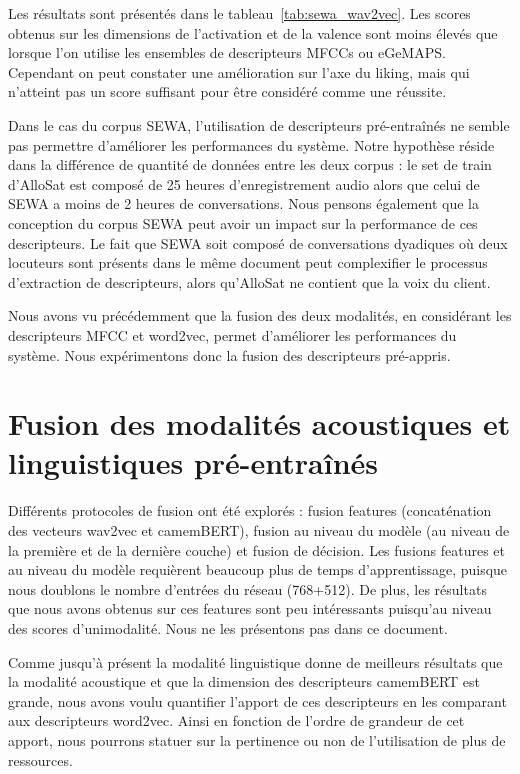 

Les résultats sont présentés dans le tableau~\ref{tab:sewa_wav2vec}. Les scores obtenus sur les dimensions de l'activation et de la valence sont moins élevés que lorsque l'on utilise les ensembles de descripteurs MFCCs ou eGeMAPS. Cependant on peut constater une amélioration sur l'axe du liking, mais qui n'atteint pas un score suffisant pour être considéré comme une réussite.

Dans le cas du corpus SEWA, l'utilisation de descripteurs pré-entraînés ne semble pas permettre d'améliorer les performances du système. Notre hypothèse réside dans la différence de quantité de données entre les deux corpus : le set de train d'AlloSat est composé de 25 heures d'enregistrement audio alors que celui de SEWA a moins de 2 heures de conversations. %
Nous pensons également que la conception du corpus SEWA peut avoir un impact sur la performance de ces descripteurs. Le fait que SEWA soit composé de conversations dyadiques où deux locuteurs sont présents dans le même document peut complexifier le processus d'extraction de descripteurs, alors qu'AlloSat ne contient que la voix du client.

Nous avons vu précédemment que la fusion des deux modalités, en considérant les descripteurs MFCC et word2vec, permet d'améliorer les performances du système. Nous expérimentons donc la fusion des descripteurs pré-appris.

\section{Fusion des modalités acoustiques et linguistiques pré-entraînés}
Différents protocoles de fusion ont été explorés : fusion features (concaténation des vecteurs wav2vec et camemBERT), fusion au niveau du modèle (au niveau de la première et de la dernière couche) et fusion de décision. Les fusions features et au niveau du modèle requièrent beaucoup plus de temps d'apprentissage, puisque nous doublons le nombre d'entrées du réseau (768+512). De plus, les résultats que nous avons obtenus sur ces features sont peu intéressants puisqu'au niveau des scores d'unimodalité. Nous ne les présentons pas dans ce document.

Comme jusqu'à présent la modalité linguistique donne de meilleurs résultats que la modalité acoustique et que la dimension des descripteurs camemBERT est grande, nous avons voulu quantifier l'apport de ces descripteurs en les comparant aux descripteurs word2vec. Ainsi en fonction de l'ordre de grandeur de cet apport, nous pourrons statuer sur la pertinence ou non de l'utilisation de plus de ressources.

